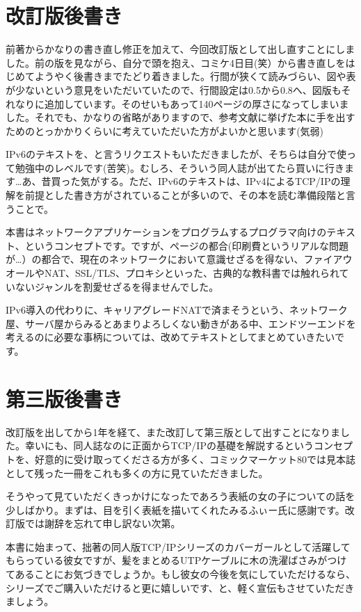 \section*{改訂版後書き}
前著からかなりの書き直し修正を加えて、今回改訂版として出し直すことにしました。前の版を見ながら、自分で頭を抱え、コミケ4日目(笑）から書き直しをはじめてようやく後書きまでたどり着きました。行間が狭くて読みづらい、図や表が少ないという意見をいただいていたので、行間設定は0.5から0.8へ、図版もそれなりに追加しています。そのせいもあって140ページの厚さになってしまいました。それでも、かなりの省略がありますので、参考文献に挙げた本に手を出すためのとっかかりくらいに考えていただいた方がよいかと思います(気弱)

IPv6のテキストを、と言うリクエストもいただきましたが、そちらは自分で使って勉強中のレベルです(苦笑)。むしろ、そういう同人誌が出てたら買いに行きます…あ、昔買った気がする。ただ、IPv6のテキストは、IPv4によるTCP/IPの理解を前提とした書き方がされていることが多いので、その本を読む準備段階と言うことで。

本書はネットワークアプリケーションをプログラムするプログラマ向けのテキスト、というコンセプトです。ですが、ページの都合(印刷費というリアルな問題が…）の都合で、現在のネットワークにおいて意識せざるを得ない、ファイアウオールやNAT、SSL/TLS、プロキシといった、古典的な教科書では触れられていないジャンルを割愛せざるを得ませんでした。

IPv6導入の代わりに、キャリアグレードNATで済まそうという、ネットワーク屋、サーバ屋からみるとあまりよろしくない動きがある中、エンドツーエンドを考えるのに必要な事柄については、改めてテキストとしてまとめていきたいです。

\section*{第三版後書き}
改訂版を出してから1年を経て、また改訂して第三版として出すことになりました。幸いにも、同人誌なのに正面からTCP/IPの基礎を解説するというコンセプトを、好意的に受け取ってくださる方が多く、コミックマーケット80では見本誌として残った一冊をこれも多くの方に見ていただきました。

そうやって見ていただくきっかけになったであろう表紙の女の子についての話を少しばかり。まずは、目を引く表紙を描いてくれたみるふぃー氏に感謝です。改訂版では謝辞を忘れて申し訳ない次第。

本書に始まって、拙著の同人版TCP/IPシリーズのカバーガールとして活躍してもらっている彼女ですが、髪をまとめるUTPケーブルに木の洗濯ばさみがつけてあることにお気づきでしょうか。もし彼女の今後を気にしていただけるなら、シリーズでご購入いただけると更に嬉しいです、と、軽く宣伝もさせていただきましょう。

